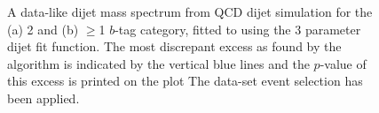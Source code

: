 \begin{figure}[!ht]
\begin{center}
  \end{center}
  \vspace{-1em}
  \caption[A data-like dijet mass spectrum from QCD dijet simulation for the 2 and $\geq$1 $b$-tag
            category, fitted to using the 3 parameter dijet fit function.]
          {A data-like dijet mass spectrum from QCD dijet simulation for the (a) 2 and (b) $\geq$1 $b$-tag
            category, fitted to using the 3 parameter dijet fit function.
            The most discrepant excess as found by the \bh{} algorithm is indicated by the vertical blue lines and the \mbox{$p$-value} of this excess is printed on the plot         
            The \summer{} data-set event selection has been applied.}
  \label{fig:DataLikeSearchPhase}
\end{figure}

